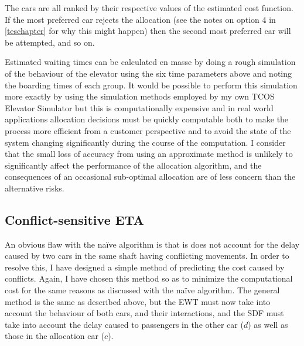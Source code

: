 \documentclass{UoYCSproject}
\begin{document}
The cars are all ranked by their respective values of the estimated cost function.  If the most preferred car rejects the allocation (see the notes on option 4 in \autoref{teschapter} for why this might happen) then the second most preferred car will be attempted, and so on.

Estimated waiting times can be calculated en masse by doing a rough simulation of the behaviour of the elevator using the six time parameters above and noting the boarding times of each group.  It would be possible to perform this simulation more exactly by using the simulation methods employed by my own TCOS Elevator Simulator but this is computationally expensive and in real world applications allocation decisions must be quickly computable both to make the process more efficient from a customer perspective and to avoid the state of the system changing significantly during the course of the computation.  I consider that the small loss of accuracy from using an approximate method is unlikely to significantly affect the performance of the allocation algorithm, and the consequences of an occasional sub-optimal allocation are of less concern than the alternative risks.

\subsection{Conflict-sensitive ETA}
\label{algETAconflict}

An obvious flaw with the na\"{i}ve algorithm is that is does not account for the delay caused by two cars in the same shaft having conflicting movements.  In order to resolve this, I have designed a simple method of predicting the cost caused by conflicts.  Again, I have chosen this method so as to minimize the computational cost for the same reasons as discussed with the na\"{i}ve algorithm.  The general method is the same as described above, but the EWT must now take into account the behaviour of both cars, and their interactions, and the SDF must take into account the delay caused to passengers in the other car ($d$) as well as those in the allocation car ($c$).
\end{document}

